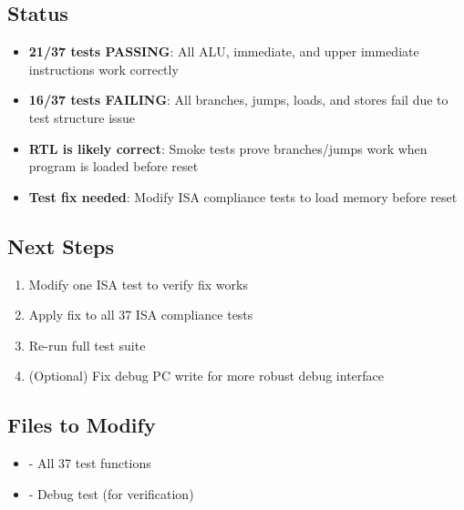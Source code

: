 \subsection{Status}\label{cr:fix:rtl-isa-test-fix:status}

\begin{record}

\begin{itemize}
\tightlist
\item
  \textbf{21/37 tests PASSING}: All ALU, immediate, and upper immediate
  instructions work correctly
\item
  \textbf{16/37 tests FAILING}: All branches, jumps, loads, and stores
  fail due to test structure issue
\item
  \textbf{RTL is likely correct}: Smoke tests prove
  branches/\allowbreak{}jumps work when program is loaded before reset
\item
  \textbf{Test fix needed}: Modify ISA compliance tests to load memory
  before reset
\end{itemize}

\end{record}

\subsection{Next Steps}\label{cr:fix:rtl-isa-test-fix:next-steps}

\begin{record}

\begin{enumerate}
\def\labelenumi{\arabic{enumi}.}
\tightlist
\item
  \ok{} Modify one ISA test to verify fix works
\item
  Apply fix to all 37 ISA compliance tests
\item
  Re-run full test suite
\item
  (Optional) Fix debug PC write for more robust debug interface
\end{enumerate}

\end{record}

\subsection{Files to Modify}\label{cr:fix:rtl-isa-test-fix:files-to-modify}

\begin{record}

\begin{itemize}
\tightlist
\item
   - All 37 test functions
\item
   - Debug test (for
  verification)
\end{itemize}

\end{record}

